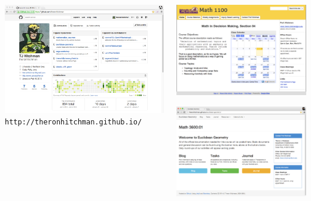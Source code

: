 \documentclass[final]{beamer}
\begin{document}
\begin{frame}{}
\begin{columns}[t]
\begin{column}{.31\linewidth}
\begin{block}{}
	 \vspace{1in}
	 \centering
	 \includegraphics[width=.6\textwidth]{gh.pdf}
	 \vspace{1in} 
           \texttt{http://theronhitchman.github.io/}\\
         \end{block}
      \end{column}
      
      
      \begin{column}{.31\linewidth}
        \begin{block}{}
            \centering
            \includegraphics[width=.5\linewidth]{decisionmakingweb}
         \end{block}

        \begin{block}{}
          \centering
            \includegraphics[width=.5\linewidth]{EGweb}
        \end{block}


\end{column}
\end{columns}
\end{frame}
\end{document}
